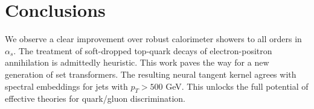 \section{Conclusions}\label{sec:conclusions}

We observe a clear improvement over robust calorimeter showers to all
orders in $\alpha_s$. The treatment of soft-dropped top-quark decays of
electron-positron annihilation is admittedly heuristic. This work paves
the way for a new generation of set transformers. The resulting neural
tangent kernel agrees with spectral embeddings for jets with $p_T > 500$
GeV. This unlocks the full potential of effective theories for
quark/gluon discrimination.

